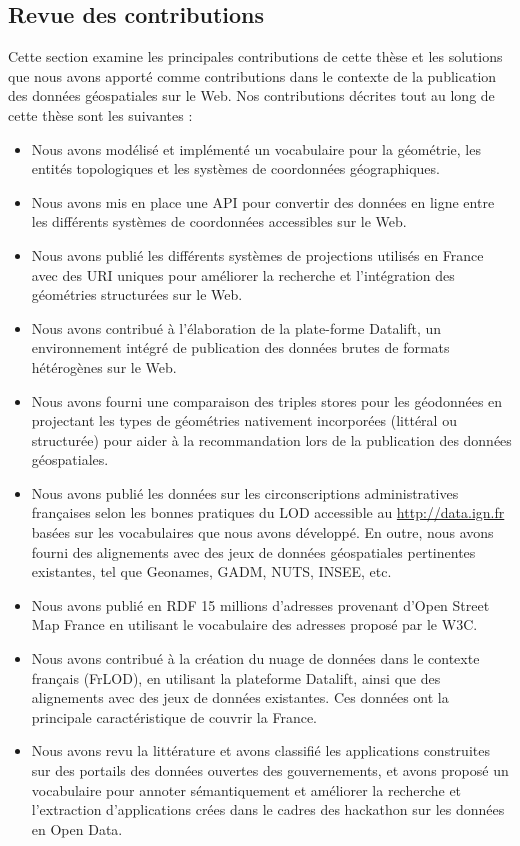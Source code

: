 \documentclass[a4paper,11pt,twoside]{report}
\begin{document}
\subsection*{Revue des contributions}
Cette section examine les principales contributions de cette thèse et les solutions que nous avons apporté comme contributions dans le contexte de la publication des données géospatiales sur le Web. Nos contributions décrites tout au long de cette thèse sont les suivantes :

\begin{itemize}
 \item Nous avons modélisé et implémenté un vocabulaire pour la géométrie, les entités topologiques et les systèmes de coordonnées géographiques.
 \item Nous avons mis en place une API pour convertir des données en ligne entre les différents systèmes de coordonnées accessibles sur le Web.
 \item Nous avons publié les différents systèmes de projections utilisés en France avec des URI uniques pour améliorer la recherche et l'intégration des géométries structurées sur le Web.
 \item Nous avons contribué à l'élaboration de la plate-forme Datalift, un environnement intégré de publication des données brutes de formats hétérogènes sur le Web.
 \item Nous avons fourni une comparaison des triples stores pour les géodonnées en projectant les types de géométries nativement incorporées (littéral ou structurée) pour aider à la recommandation lors de la publication des données géospatiales.
 \item Nous avons publié les données sur les circonscriptions administratives françaises selon les bonnes pratiques du LOD accessible au \url{http://data.ign.fr} basées sur les vocabulaires que nous avons développé. En outre, nous avons fourni des alignements avec des jeux de données géospatiales pertinentes existantes, tel que Geonames, GADM, NUTS, INSEE, etc.
 \item Nous avons publié en RDF 15 millions d'adresses provenant d'Open Street Map France en utilisant le vocabulaire des adresses proposé par le W3C.
 \item Nous avons contribué à la création du nuage de données dans le contexte  français (FrLOD), en utilisant la plateforme Datalift, ainsi que des alignements avec des jeux de données existantes. Ces données ont la principale caractéristique de couvrir la France.
 \item Nous avons revu la littérature et avons classifié les applications construites sur des portails des données ouvertes des gouvernements, et avons proposé un vocabulaire pour annoter sémantiquement et améliorer la recherche et l'extraction d'applications crées dans le cadres des hackathon sur les données en Open Data.

\end{itemize}
\end{document}

